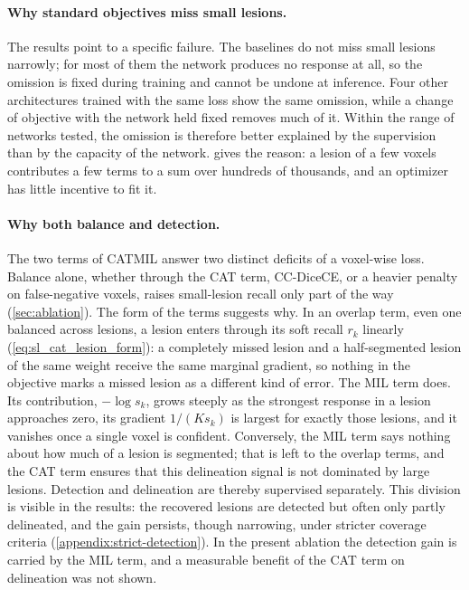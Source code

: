 \paragraph{Why standard objectives miss small lesions.}
The results point to a specific failure. The baselines do not miss small
lesions narrowly; for most of them the network produces no response at all,
so the omission is fixed during training and cannot be undone at
inference. Four other architectures trained with the same loss show the
same omission, while a change of objective with the network held fixed
removes much of it. Within the range of networks tested, the omission is
therefore better explained by the supervision than by the capacity of the
network.  gives the reason: a lesion of a few voxels
contributes a few terms to a sum over hundreds of thousands, and an
optimizer has little incentive to fit it.

\paragraph{Why both balance and detection.}
The two terms of CATMIL answer two distinct deficits of a voxel-wise loss.
Balance alone, whether through the CAT term, CC-DiceCE, or a heavier
penalty on false-negative voxels, raises small-lesion recall only part of
the way (\cref{sec:ablation}). The form of the terms suggests why. In an
overlap term, even one balanced across lesions, a lesion enters through its
soft recall $r_k$ linearly (\cref{eq:sl_cat_lesion_form}): a completely
missed lesion and a half-segmented lesion of the same weight receive the
same marginal gradient, so nothing in the objective marks a missed lesion
as a different kind of error. The MIL term does. Its contribution,
$-\log s_k$, grows steeply as the strongest response in a lesion approaches
zero, its gradient $1/(K s_k)$ is largest for exactly those lesions, and it
vanishes once a single voxel is confident. Conversely, the MIL term says
nothing about how much of a lesion is segmented; that is left to the
overlap terms, and the CAT term ensures that this delineation signal is
not dominated by large lesions. Detection and delineation are thereby
supervised separately. This division is visible in the results: the
recovered lesions are detected but often only partly delineated, and the
gain persists, though narrowing, under stricter coverage criteria
(\cref{appendix:strict-detection}). In the present ablation the detection
gain is carried by the MIL term, and a measurable benefit of the CAT term
on delineation was not shown.

